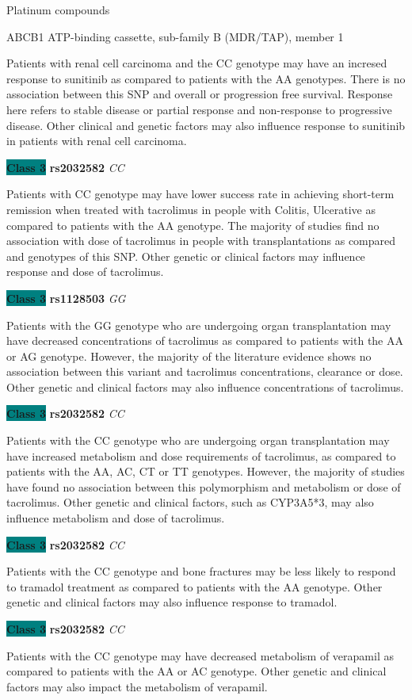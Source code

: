\documentclass{resume} %
\begin{document}
\begin{rSection}{ Platinum compounds }
\begin{rSubsection}{ ABCB1 }{ ATP-binding cassette, sub-family B (MDR/TAP), member 1 }{}{}
\item[] Patients with renal cell carcinoma and the CC genotype may have an incresed response to sunitinib as compared to patients with the AA genotypes. There is no association between this SNP and overall or progression free survival.   Response here refers to stable disease or partial response and non-response to progressive disease. Other clinical and genetic factors may also influence response to sunitinib in patients with renal cell carcinoma. \item \textbf{\colorbox{teal} {Class 3}} \textbf{ rs2032582 } \textit{ CC }
\item[] Patients with CC genotype may have lower success rate in achieving short-term remission when treated with tacrolimus in people with Colitis, Ulcerative as compared to patients with the AA genotype. The majority of studies find no association with dose of tacrolimus in people with transplantations as compared and genotypes of this SNP. Other genetic or clinical factors may influence response and dose of tacrolimus.\item \textbf{\colorbox{teal} {Class 3}} \textbf{ rs1128503 } \textit{ GG }
\item[] Patients with the GG genotype who are undergoing organ transplantation may have decreased concentrations of tacrolimus as compared to patients with the AA or AG genotype. However, the majority of the literature evidence shows no association between this variant and tacrolimus concentrations, clearance or dose. Other genetic and clinical factors may also influence concentrations of tacrolimus. \item \textbf{\colorbox{teal} {Class 3}} \textbf{ rs2032582 } \textit{ CC }
\item[] Patients with the CC genotype who are undergoing organ transplantation may have increased metabolism and dose requirements of tacrolimus, as compared to patients with the AA, AC, CT or TT genotypes. However, the majority of studies have found no association between this polymorphism and metabolism or dose of tacrolimus. Other genetic and clinical factors, such as CYP3A5*3, may also influence metabolism and dose of tacrolimus.\item \textbf{\colorbox{teal} {Class 3}} \textbf{ rs2032582 } \textit{ CC }
\item[] Patients with the CC genotype and bone fractures may be less likely to respond to tramadol treatment as compared to patients with the AA genotype. Other genetic and clinical factors may also influence response to tramadol. \item \textbf{\colorbox{teal} {Class 3}} \textbf{ rs2032582 } \textit{ CC }
\item[] Patients with the CC genotype may have decreased metabolism of verapamil as compared to patients with the AA or AC genotype. Other genetic and clinical factors may also impact the metabolism of verapamil.
\end{rSubsection}


\end{rSection}
\end{document}
